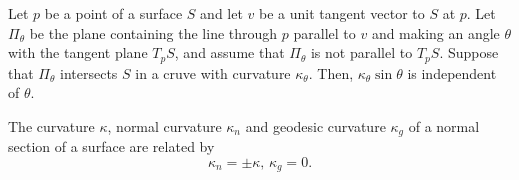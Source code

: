 \begin{proposition}
  Let $p$ be a point of a surface $S$ and let $v$ be a unit tangent
  vector to $S$ at $p$. Let $\Pi_{\theta}$ be the plane containing
  the line through $p$ parallel to $v$ and making an angle $\theta$ with
  the tangent plane $T_p S$, and assume that $\Pi_{\theta}$ is not
  parallel to $T_p S$. Suppose that $\Pi_{\theta}$ intersects $S$
  in a cruve with curvature $\kappa_{\theta}$. Then,
  $\kappa_{\theta} \sin \theta$ is independent of $\theta$.
\end{proposition}

\begin{corollary}
  The curvature $\kappa$, normal curvature $\kappa_n$ and
  geodesic curvature $\kappa_g$ of a normal section of a surface are
  related by
  \[
    \kappa_n = \pm \kappa, \, \kappa_g = 0.  
  \]
\end{corollary}